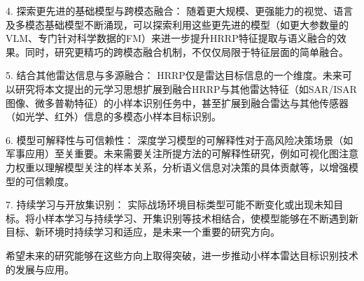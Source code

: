 4.  探索更先进的基础模型与跨模态融合： 随着更大规模、更强能力的视觉、语言及多模态基础模型不断涌现，可以探索利用这些更先进的模型（如更大参数量的VLM、专门针对科学数据的FM）来进一步提升HRRP特征提取与语义融合的效果。同时，研究更精巧的跨模态融合机制，不仅仅局限于特征层面的简单融合。

5.  结合其他雷达信息与多源融合： HRRP仅是雷达目标信息的一个维度。未来可以研究将本文提出的元学习思想扩展到融合HRRP与其他雷达特征（如SAR/ISAR图像、微多普勒特征）的小样本识别任务中，甚至扩展到融合雷达与其他传感器（如光学、红外）信息的多模态小样本目标识别。

6.  模型可解释性与可信赖性： 深度学习模型的可解释性对于高风险决策场景（如军事应用）至关重要。未来需要关注所提方法的可解释性研究，例如可视化图注意力权重以理解模型关注的样本关系，分析语义信息对决策的具体贡献等，以增强模型的可信赖度。

7.  持续学习与开放集识别： 实际战场环境目标类型可能不断变化或出现未知目标。将小样本学习与持续学习、开集识别等技术相结合，使模型能够在不断遇到新目标、新环境时持续学习和适应，是未来一个重要的研究方向。

希望未来的研究能够在这些方向上取得突破，进一步推动小样本雷达目标识别技术的发展与应用。